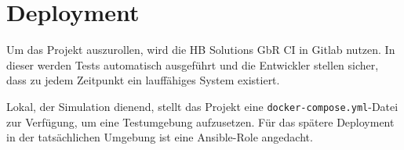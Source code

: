 \documentclass[
    fontsize=12pt,
    parskip=half
]{scrartcl}
\begin{document}
\section{Deployment}
Um das Projekt auszurollen, wird die HB Solutions GbR CI in Gitlab nutzen. 
In dieser werden Tests automatisch ausgeführt und die Entwickler stellen sicher, dass zu jedem Zeitpunkt ein lauffähiges System existiert.

Lokal, der Simulation dienend, stellt das Projekt eine \texttt{docker-compose.yml}-Datei zur Verfügung, um eine Testumgebung aufzusetzen.
Für das spätere Deployment in der tatsächlichen Umgebung ist eine Ansible-Role angedacht.
\end{document}
